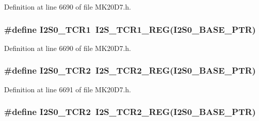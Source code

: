 Definition at line 6690 of file M\+K20\+D7.\+h.

\subsubsection[{\texorpdfstring{I2\+S0\+\_\+\+T\+C\+R1}{I2S0_TCR1}}]{\setlength{\rightskip}{0pt plus 5cm}\#define I2\+S0\+\_\+\+T\+C\+R1~{\bf I2\+S\+\_\+\+T\+C\+R1\+\_\+\+R\+EG}({\bf I2\+S0\+\_\+\+B\+A\+S\+E\+\_\+\+P\+TR})}\hypertarget{group___i2_s___register___accessor___macros_ga8648b4f2138e546297726060411e9f5f}{}\label{group___i2_s___register___accessor___macros_ga8648b4f2138e546297726060411e9f5f}


Definition at line 6690 of file M\+K20\+D7.\+h.

\subsubsection[{\texorpdfstring{I2\+S0\+\_\+\+T\+C\+R2}{I2S0_TCR2}}]{\setlength{\rightskip}{0pt plus 5cm}\#define I2\+S0\+\_\+\+T\+C\+R2~{\bf I2\+S\+\_\+\+T\+C\+R2\+\_\+\+R\+EG}({\bf I2\+S0\+\_\+\+B\+A\+S\+E\+\_\+\+P\+TR})}\hypertarget{group___i2_s___register___accessor___macros_ga52e49a53188ba833534a7b9798f88182}{}\label{group___i2_s___register___accessor___macros_ga52e49a53188ba833534a7b9798f88182}


Definition at line 6691 of file M\+K20\+D7.\+h.

\subsubsection[{\texorpdfstring{I2\+S0\+\_\+\+T\+C\+R2}{I2S0_TCR2}}]{\setlength{\rightskip}{0pt plus 5cm}\#define I2\+S0\+\_\+\+T\+C\+R2~{\bf I2\+S\+\_\+\+T\+C\+R2\+\_\+\+R\+EG}({\bf I2\+S0\+\_\+\+B\+A\+S\+E\+\_\+\+P\+TR})}\hypertarget{group___i2_s___register___accessor___macros_ga52e49a53188ba833534a7b9798f88182}{}\label{group___i2_s___register___accessor___macros_ga52e49a53188ba833534a7b9798f88182}


